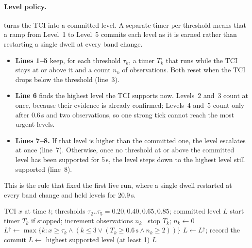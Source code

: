 \paragraph{Level policy.}  turns the TCI into a committed level. A separate timer per threshold means that a ramp from Level~1 to Level~5 commits each level as it is earned rather than restarting a single dwell at every band change.
\begin{itemize}
\item \textbf{Lines 1--5} keep, for each threshold $\tau_k$, a timer $T_k$ that runs while the TCI stays at or above it and a count $n_k$ of observations. Both reset when the TCI drops below the threshold (line~3).
\item \textbf{Line 6} finds the highest level the TCI supports now. Levels~2 and~3 count at once, because their evidence is already confirmed; Levels~4 and~5 count only after 0.6\,s and two observations, so one strong tick cannot reach the most urgent levels.
\item \textbf{Lines 7--8.} If that level is higher than the committed one, the level escalates at once (line~7). Otherwise, once no threshold at or above the committed level has been supported for 5\,s, the level steps down to the highest level still supported (line~8).
\end{itemize}
This is the rule that fixed the first live run, where a single dwell restarted at every band change and held levels for 20.9\,s.

\begin{algorithm}[htbp]
\caption{Level policy with per-threshold timers}
\label{alg:policy}
\small
\begin{algorithmic}[1]
\Require TCI $x$ at time $t$; thresholds $\tau_2..\tau_5 = 0.20, 0.40, 0.65, 0.85$; committed level $L$
   start timer $T_k$ if stopped; increment observations $n_k$
  \Else\ stop $T_k$; $n_k \gets 0$ \EndIf
\EndFor
\State $L^\uparrow \gets \max\{k : x \geq \tau_k \wedge (k \leq 3 \vee (T_k \geq 0.6\,\text{s} \wedge n_k \geq 2))\}$
 $L \gets L^\uparrow$; record the commit 
 $L \gets$ highest supported level (at least 1) 
\EndIf
\State \Return $L$
\end{algorithmic}
\end{algorithm}


